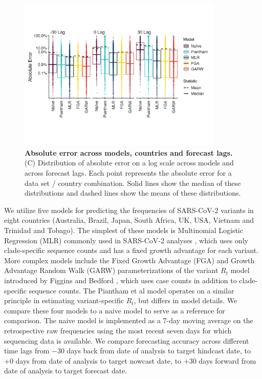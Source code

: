 \documentclass[11pt,oneside,letterpaper]{article}
\begin{document}
\begin{figure}[tb!]
	\centering
	\includegraphics[width=0.87\textwidth]{figures/model_comp_B.png}
	\caption{\textbf{Absolute error across models, countries and forecast lags.}
	(C) Distribution of absolute error on a log scale across models and across forecast lags.
	Each point represents the absolute error for a data set / country combination.
	Solid lines show the median of these distributions and dashed lines show the means of these distributions.
	}
	\label{fig:model_comp_B}
\end{figure}



We utilize five models for predicting the frequencies of SARS-CoV-2 variants in eight countries (Australia, Brazil, Japan, South Africa, UK, USA, Vietnam and Trinidad and Tobago).
The simplest of these models is Multinomial Logistic Regression (MLR) commonly used in SARS-CoV-2 analyses \cite{annavajhala2021emergence, faria2021genomics, obermeyer2022analysis, susswein2023early}, which uses only clade-specific sequence counts and has a fixed growth advantage for each variant.
More complex models include the Fixed Growth Advantage (FGA) and Growth Advantage Random Walk (GARW) parameterizations of the variant $R_t$ model introduced by Figgins and Bedford \cite{figgins2022sars}, which uses case counts in addition to clade-specific sequence counts.
The Piantham et al model \cite{piantham2021estimating} operates on a similar principle in estimating variant-specific $R_t$, but differs in model details.
We compare these four models to a naive model to serve as a reference for comparison.
The naive model is implemented as a 7-day moving average on the retrospective raw frequencies using the most recent seven days for which sequencing data is available.
We compare forecasting accuracy across different time lags from $-30$ days back from date of analysis to target hindcast date, to +0 days from date of analysis to target nowcast date, to $+30$ days forward from date of analysis to target forecast date.
\end{document}
